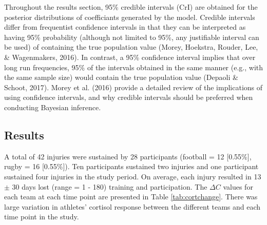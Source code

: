 \documentclass[
  english,
  man,floatsintext]{apa6}
\begin{document}
Throughout the results section, 95\% credible intervals (CrI) are obtained for the posterior distributions of coefficiants generated by the model.
Credible intervals differ from frequentist confidence intervals in that they can be interpreted as having 95\% probability (although not limited to 95\%, any justifiable interval can be used) of containing the true population value (Morey, Hoekstra, Rouder, Lee, \& Wagenmakers, 2016).
In contrast, a 95\% confidence interval implies that over long run frequencies, 95\% of the intervals obtained in the same manner (e.g., with the same sample size) would contain the true population value (Depaoli \& Schoot, 2017).
Morey et al. (2016) provide a detailed review of the implications of using confidence intervals, and why credible intervals should be preferred when conducting Bayesian inference.

\hypertarget{results-3}{%
\subsection{Results}\label{results-3}}

A total of 42 injuries were sustained by 28 participants (football = 12 {[}0.55\%{]}, rugby = 16 {[}0.55\%{]}).
Ten participants sustained two injuries and one participant sustained four injuries in the study period. On average, each injury resulted in 13 \(\pm\) 30 days lost (range = 1 - 180) training and participation.
The \(\Delta C\) values for each team at each time point are presented in Table \ref{tab:cortchange}.
There was large variation in athletes' cortisol response between the different teams and each time point in the study.
\end{document}
